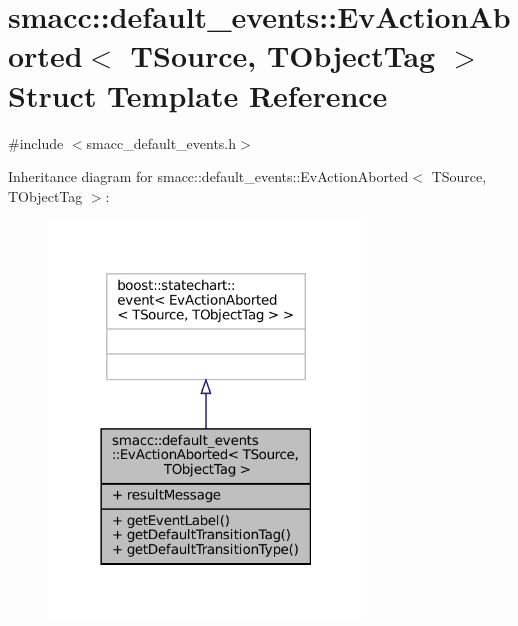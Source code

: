 \hypertarget{structsmacc_1_1default__events_1_1EvActionAborted}{}\section{smacc\+:\+:default\+\_\+events\+:\+:Ev\+Action\+Aborted$<$ T\+Source, T\+Object\+Tag $>$ Struct Template Reference}
\label{structsmacc_1_1default__events_1_1EvActionAborted}


{\ttfamily \#include $<$smacc\+\_\+default\+\_\+events.\+h$>$}



Inheritance diagram for smacc\+:\+:default\+\_\+events\+:\+:Ev\+Action\+Aborted$<$ T\+Source, T\+Object\+Tag $>$\+:
\nopagebreak
\begin{figure}[H]
\begin{center}
\leavevmode
\includegraphics[width=237pt]{structsmacc_1_1default__events_1_1EvActionAborted__inherit__graph}
\end{center}
\end{figure}


